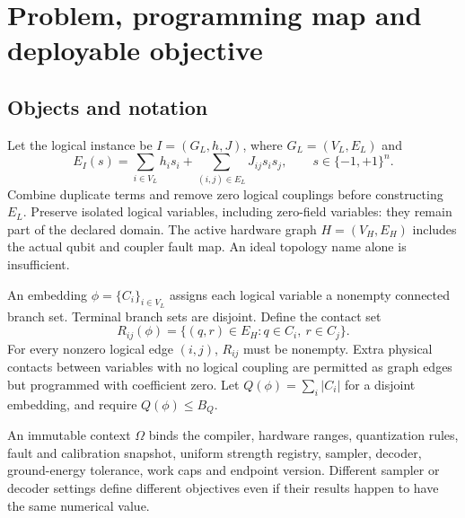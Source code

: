 \section{Problem, programming map and deployable objective}\label{sec:objective}
\subsection{Objects and notation}
Let the logical instance be $I=(G_L,h,J)$, where $G_L=(V_L,E_L)$ and
\begin{equation}
E_I(s)=\sum_{i\in V_L}h_i s_i+\sum_{(i,j)\in E_L}J_{ij}s_i s_j,\qquad s\in\{-1,+1\}^{n}.
\end{equation}
Combine duplicate terms and remove zero logical couplings before constructing $E_L$. Preserve isolated logical variables, including zero-field variables: they remain part of the declared domain. The active hardware graph $H=(V_H,E_H)$ includes the actual qubit and coupler fault map. An ideal topology name alone is insufficient.

An embedding $\phi=\{C_i\}_{i\in V_L}$ assigns each logical variable a nonempty connected branch set. Terminal branch sets are disjoint. Define the contact set
\begin{equation}
R_{ij}(\phi)=\{(q,r)\in E_H:q\in C_i,\ r\in C_j\}.
\end{equation}
For every nonzero logical edge $(i,j)$, $R_{ij}$ must be nonempty. Extra physical contacts between variables with no logical coupling are permitted as graph edges but programmed with coefficient zero. Let $Q(\phi)=\sum_i|C_i|$ for a disjoint embedding, and require $Q(\phi)\le B_Q$.

An immutable context $\Omega$ binds the compiler, hardware ranges, quantization rules, fault and calibration snapshot, uniform strength registry, sampler, decoder, ground-energy tolerance, work caps and endpoint version. Different sampler or decoder settings define different objectives even if their results happen to have the same numerical value.

